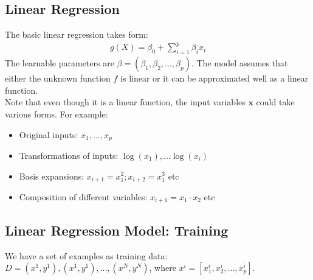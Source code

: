 \documentclass{article}
\begin{document}
\subsection{Linear Regression}
The basic linear regression takes form:
\begin{align*}
    g(X) = \beta_{0} + \sum_{i=1}^{p}\beta_{i}x_{i}
\end{align*}
The learnable parameters are $\beta = (\beta_{1}, \beta_{2}, ..., \beta_{p})$. The model assumes that either the unknown function $f$ is linear or it can be approximated well as a linear function.\\
Note that even though it is a linear function, the input variables $\mathbf{x}$ could take various forms. For example:
\begin{itemize}
    \item Original inputs: $x_{1}, ..., x_{p}$
    \item Transformations of inputs: $\log(x_1), ... \log(x_{i})$
    \item Basis expansions: $x_{i+1} = x_{1}^{2}; x_{i+2} = x_{1}^{3}$ etc
    \item Composition of different variables: $x_{i+1} = x_{1} \cdot x_{2}$ etc
\end{itemize}

\subsection{Linear Regression Model: Training}
We have a set of examples as training data: $D = {(x^{1}, y^{1}), (x^{1}, y^{1}), ..., (x^{N}, y^{N})}$, where $x^{i} = [x_{1}^{i}, x_{2}^{i}, ..., x_{p}^{i}]$.\\
\end{document}
